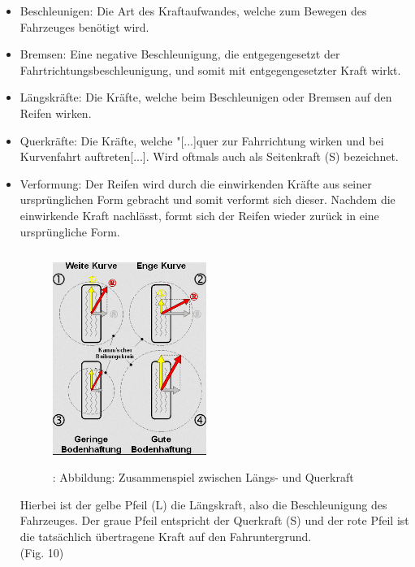 				\begin{itemize}
					\item Beschleunigen: Die Art des Kraftaufwandes, welche zum Bewegen des Fahrzeuges benötigt wird.
					\item Bremsen: Eine negative Beschleunigung, die entgegengesetzt der Fahrtrichtungsbeschleunigung, und somit mit entgegengesetzter Kraft wirkt.
					\item Längskräfte: Die Kräfte, welche beim Beschleunigen oder Bremsen auf den Reifen wirken.
					\item Querkräfte: Die Kräfte, welche "[...]quer zur Fahrrichtung wirken und bei Kurvenfahrt auftreten[...].\cite{TS18} Wird oftmals auch als Seitenkraft (S) bezeichnet.
					\item Verformung: Der Reifen wird durch die einwirkenden Kräfte aus seiner ursprünglichen Form gebracht und somit verformt sich dieser. Nachdem die einwirkende Kraft nachlässt, formt sich der Reifen wieder zurück in eine ursprüngliche Form.
					
					\begin{figure}
						\centering
						\includegraphics[width=5cm, height=7cm] {l_qkraft.png}
						\caption {\cite{TS19}: Abbildung: Zusammenspiel zwischen Längs- und Querkraft}
					\end{figure}
					
					\begin{flushleft}
						Hierbei ist der gelbe Pfeil (L) die Längskraft, also die Beschleunigung des Fahrzeuges.
						Der graue Pfeil entspricht der Querkraft (S) und der rote Pfeil ist die tatsächlich übertragene Kraft auf den Fahruntergrund.\\ (Fig. 10)
					\end{flushleft}
					  
				\end{itemize}
			

